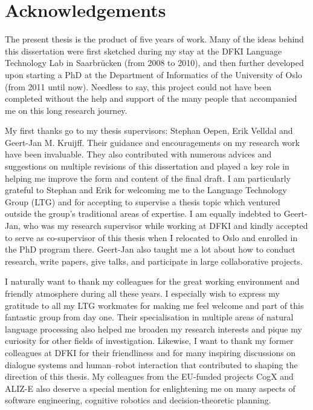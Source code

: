 \chapter*{Acknowledgements}

The present thesis is the product of five years of work. Many of the ideas behind this dissertation were first sketched during my stay at the DFKI Language Technology Lab in Saarbr\"ucken (from 2008 to 2010), and then further developed upon starting a PhD at the Department of Informatics of the University of Oslo (from 2011 until now).  Needless to say, this project could not have been completed without the help and support of the many people that accompanied me on this long research journey.

My first thanks go to my thesis supervisors: Stephan Oepen, Erik Velldal and Geert-Jan M. Kruijff.  Their guidance and encouragements on my research work have been invaluable.  They also contributed with numerous advices and suggestions on multiple revisions of this dissertation and played a key role in helping me improve the form and content of the final draft. I am particularly grateful to Stephan and Erik for welcoming me to the Language Technology Group (LTG) and for accepting to supervise a thesis topic which ventured outside the group's traditional areas of expertise. I am equally indebted to Geert-Jan, who was my research supervisor while working at DFKI and kindly accepted to serve as co-supervisor of this thesis when I relocated to Oslo and enrolled in the PhD program there. Geert-Jan  also taught me a lot about how to conduct research, write papers, give talks, and participate in large collaborative projects.

I naturally want to thank my colleagues for the great working environment and friendly atmosphere during all these years.  I especially wish to express my gratitude to all my LTG workmates for making me feel welcome and part of this fantastic group from day one. Their specialisation in multiple areas of natural language processing also helped me broaden my research interests and pique my curiosity for other fields of investigation.  Likewise, I want to thank my former colleagues at DFKI for their friendliness and for many inspiring discussions on dialogue systems and human--robot interaction that contributed to shaping the direction of this thesis. My colleagues from the EU-funded projects CogX and ALIZ-E also deserve a special mention for enlightening me on many aspects of software engineering, cognitive robotics and decision-theoretic planning.

